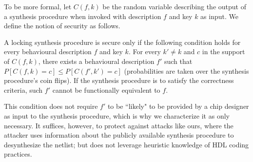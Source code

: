 


To be more formal, let $C(f,k)$ be the random variable describing the output of a synthesis procedure when invoked with description $f$ and key $k$ as input. We define the notion of security as follows.
\begin{definition}
A locking synthesis procedure is secure only if the following condition holds for every behavioural description $f$ and key $k$. For every $k'\neq k$ and $c$ in the support of $C(f,k)$, there exists a behavioural description $f'$ such that
$P[C(f,k)=c]\leq P[C(f',k')=c]$
(probabilities are taken over the synthesis procedure's coin flips). If the synthesis procedure is to satisfy the correctness criteria, such $f'$ cannot be functionally equivalent to $f$.

\end{definition}

This condition does not require $f'$ to be ``likely" to be provided by a chip designer as input to the synthesis procedure, which is why we characterize it as only necessary. It suffices, however, to protect against attacks like ours, where the attacker uses information about the publicly available synthesis procedure to desynthesize the netlist; but does not leverage heuristic knowledge of HDL coding practices.

